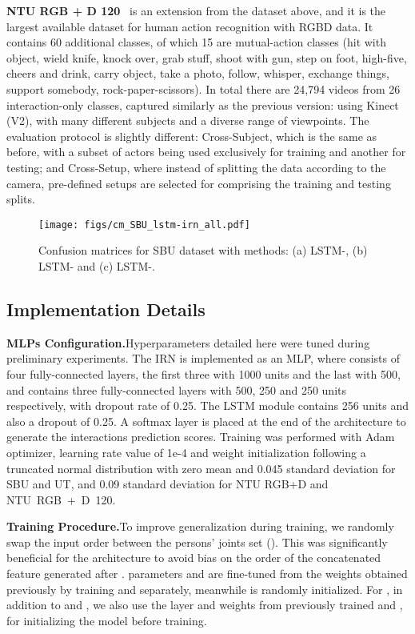 \documentclass[journal,twoside]{IEEEtran}
\begin{document}
\textbf{NTU RGB + D 120}~\cite{Liu2019} is an extension from the dataset above, and it is the largest available dataset for human action recognition with RGBD data.
It contains 60 additional classes, of which 15 are mutual-action classes (hit with object, wield knife, knock over, grab stuff, shoot with gun, step on foot, high-five, cheers and drink, carry object, take a photo, follow, whisper, exchange things, support somebody, rock-paper-scissors). 
In total there are 24,794 videos from 26 interaction-only classes, captured similarly as the previous version: using Kinect (V2), with many different subjects and a diverse range of viewpoints.
The evaluation protocol is slightly different: Cross-Subject, which is the same as before, with a subset of actors being used exclusively for training and another for testing; and Cross-Setup, where instead of splitting the data according to the camera, pre-defined setups are selected for comprising the training and testing splits.


\begin{figure*}[!ht]
	\centering
	\texttt{[image: figs/cm\_SBU\_lstm-irn\_all.pdf]}
	\caption{Confusion matrices for SBU dataset with methods: (a) LSTM-, (b) LSTM- and (c) LSTM-.
	}
	\label{fig:confusion_matrix_sbu}
\end{figure*}

\subsection{Implementation Details}

\textbf{MLPs Configuration.}\quad Hyperparameters detailed here were tuned during preliminary experiments.
The IRN is implemented as an MLP, where  consists of four fully-connected layers, the first three with 1000 units and the last with 500, and
 contains three fully-connected layers with 500, 250 and 250 units respectively, with dropout rate of 0.25.
The LSTM module contains 256 units and also a dropout of 0.25.
A softmax layer is placed at the end of the architecture to generate the interactions prediction scores.
Training was performed with Adam optimizer, learning rate value of 1e-4 and weight initialization following a truncated normal distribution with zero mean and 0.045 standard deviation for SBU and UT, and 0.09 standard deviation for NTU RGB+D and NTU~RGB~+~D~120.


\textbf{Training Procedure.}\quad To improve generalization during training, we randomly swap the input order between the persons' joints set (). This was significantly beneficial for the  architecture to avoid bias on the order of the concatenated feature generated after .
 parameters  and  are fine-tuned from the weights obtained previously by training  and  separately, meanwhile  is randomly initialized.
For ,  in addition to  and , 
we also use the  layer and weights from previously trained  and , for initializing the model before training.
\end{document}
